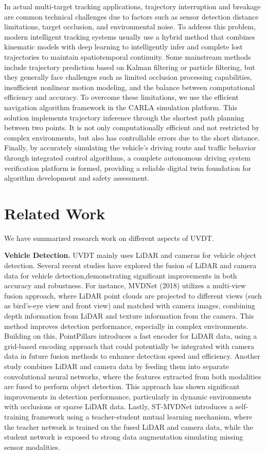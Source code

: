 \documentclass[lettersize,journal]{IEEEtran}
\begin{document}
In actual multi-target tracking applications, trajectory interruption and breakage are common technical challenges due to factors such as sensor detection distance limitations, target occlusion, and environmental noise. 
To address this problem, modern intelligent tracking systems usually use a hybrid method that combines kinematic models with deep learning to intelligently infer and complete lost trajectories to maintain spatiotemporal continuity\cite{Alpher24f}. 
Some mainstream methods include trajectory prediction based on Kalman filtering or particle filtering, but they generally face challenges such as limited occlusion processing capabilities, insufficient nonlinear motion modeling, and the balance between computational efficiency and accuracy. To overcome these limitations, we use the efficient navigation algorithm framework in the CARLA simulation platform. 
This solution implements trajectory inference through the shortest path planning between two points. 
It is not only computationally efficient and not restricted by complex environments, but also has controllable errors due to the short distance.
Finally, by accurately simulating the vehicle's driving route and traffic behavior through integrated control algorithms, a complete autonomous driving system verification platform is formed, providing a reliable digital twin foundation for algorithm development and safety assessment\cite{Alpher24c}.

\section{Related Work}

We have summarized research work on different aspects of UVDT.

\textbf{Vehicle Detection.}
UVDT mainly uses LiDAR and cameras for vehicle object detection.
Several recent studies have explored the fusion of LiDAR and camera data for vehicle detection,demonstrating significant improvements in both accuracy and robustness. 
For instance, MVDNet (2018) utilizes a multi-view fusion approach, where LiDAR point clouds are projected to different views (such as bird’s-eye view and front view) and matched with camera images, combining depth information from LiDAR and texture information from the camera. 
This method improves detection performance, especially in complex environments\cite{Alpher22h}. 
Building on this, PointPillars introduces a fast encoder for LiDAR data, using a grid-based encoding approach that could potentially be integrated with camera data in future fusion methods to enhance detection speed and efficiency\cite{Alpher19}.
Another study combines LiDAR and camera data by feeding them into separate convolutional neural networks, where the features extracted from both modalities are fused to perform object detection\cite{Alpher20e}. 
This approach has shown significant improvements in detection performance, particularly in dynamic environments with occlusions or sparse LiDAR data.
Lastly, ST-MVDNet introduces a self-training framework using a teacher-student mutual learning mechanism, where the teacher network is trained on the fused LiDAR and camera data, while the student network is exposed to strong data augmentation simulating missing sensor modalities\cite{Alpher22f}. 
\end{document}
